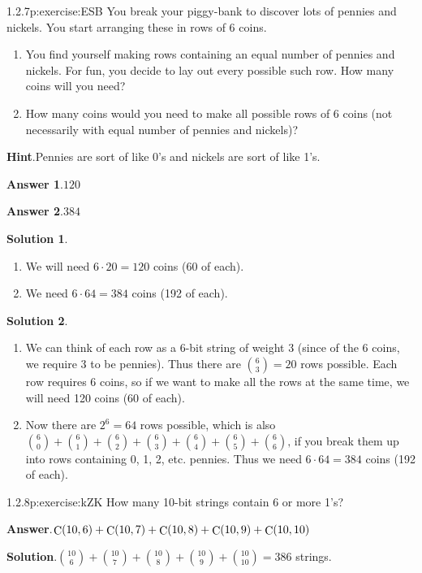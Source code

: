 \documentclass[twoside,11pt,]{book}
\newcommand{\blocktitlefont}{\relax}
\numberwithin{equation}{chapter}
\begin{document}
\begin{divisionsolution}{1.2.7}{}{p:exercise:ESB}%
You break your piggy-bank to discover lots of pennies and nickels. You start arranging these in rows of 6 coins.%
\begin{enumerate}[label=(\alph*)]
\item{}You find yourself making rows containing an equal number of pennies and nickels. For fun, you decide to lay out every possible such row. How many coins will you need?%
\item{}How many coins would you need to make all possible rows of 6 coins (not necessarily with equal number of pennies and nickels)?%
\end{enumerate}
%
\par\smallskip%
\noindent\textbf{\blocktitlefont Hint}.\quad{}Pennies are sort of like 0's and nickels are sort of like 1's.%
\par\smallskip%
\noindent\textbf{\blocktitlefont Answer 1}.\quad{}\(120\)%
\par\smallskip%
\noindent\textbf{\blocktitlefont Answer 2}.\quad{}\(384\)%
\par\smallskip%
\noindent\textbf{\blocktitlefont Solution 1}.\quad{}%
\begin{enumerate}[label=(\alph*)]
\item{}We will need \(6\cdot 20 = 120\) coins (60 of each).%
\item{}We need \(6 \cdot 64 = 384\) coins (192 of each).%
\end{enumerate}
%
\par\smallskip%
\noindent\textbf{\blocktitlefont Solution 2}.\quad{}%
\begin{enumerate}[label=(\alph*)]
\item{}We can think of each row as a 6-bit string of weight 3 (since of the 6 coins, we require 3 to be pennies). Thus there are \({6 \choose 3} = 20\) rows possible. Each row requires 6 coins, so if we want to make all the rows at the same time, we will need 120 coins (60 of each).%
\item{}Now there are \(2^6 = 64\) rows possible, which is also \({6 \choose 0} + {6\choose 1} + {6 \choose 2} + {6 \choose 3} + {6 \choose 4} + {6 \choose 5} + {6 \choose 6}\text{,}\) if you break them up into rows containing 0, 1, 2, etc. pennies. Thus we need \(6 \cdot 64 = 384\) coins (192 of each).%
\end{enumerate}
%
\end{divisionsolution}%
\begin{divisionsolution}{1.2.8}{}{p:exercise:kZK}%
How many 10-bit strings contain 6 or more 1's?%
\par\smallskip%
\noindent\textbf{\blocktitlefont Answer}.\quad{}\(\mathop{\rm C}\nolimits\!\left(10,6\right)+\mathop{\rm C}\nolimits\!\left(10,7\right)+\mathop{\rm C}\nolimits\!\left(10,8\right)+\mathop{\rm C}\nolimits\!\left(10,9\right)+\mathop{\rm C}\nolimits\!\left(10,10\right)\)%
\par\smallskip%
\noindent\textbf{\blocktitlefont Solution}.\quad{}\({10 \choose 6} + {10\choose 7} + {10\choose 8} + {10 \choose 9} + {10\choose 10} = 386\) strings.%
\end{divisionsolution}%
\end{document}
